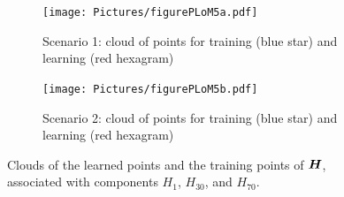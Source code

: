 \begin{figure}[!htb]
    \begin{center}
        \begin{subfigure}[b]{0.45\textwidth}
            \begin{center}
                \texttt{[image: Pictures/figurePLoM5a.pdf]}
            \end{center}
                \caption{Scenario 1: cloud of points for training (blue star) and learning (red hexagram)}
                \label{fig:figurePLoM5a}
            \end{subfigure}
            \begin{subfigure}[b]{0.45\textwidth}
                \begin{center}
                    \texttt{[image: Pictures/figurePLoM5b.pdf]}
                \end{center}
                \caption{Scenario 2: cloud of points for training (blue star) and learning (red hexagram)}
                \label{fig:figurePLoM5b}
            \end{subfigure}
    \end{center}
    \caption[Clouds of the learned points and the training points.]{Clouds of the learned points and the training points of ${\boldsymbol{H}}$, associated with components $H_1$, $H_{30}$, and $H_{70}$.}
    \label{fig:figurePLoM5}
\end{figure}
%
